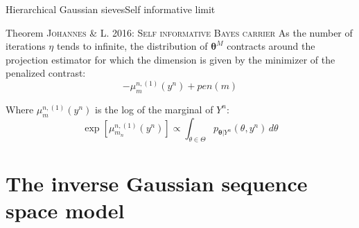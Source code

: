 \documentclass[10pt]{beamer}
\begin{document}



\begin{frame}{Hierarchical Gaussian sieves}{Self informative limit}
\begin{block}{Theorem \textsc{Johannes \& L. 2016: Self informative Bayes carrier}}
As the number of iterations $\eta$ tends to infinite, the distribution of $\boldsymbol{\theta}^{M}$ contracts around the projection estimator for which the dimension is given by the minimizer of the penalized contrast:
\[-\mu_{m}^{n, (1)}(y^{n}) + pen(m)\]
\end{block}
Where $\mu_{m}^{n, (1)}(y^{n})$ is the log of the marginal of $Y^{n}$:
\[\exp\left[\mu_{m_{n}}^{n, \left(1\right)}\left(y^{n}\right)\right] \propto \int_{\theta \in \Theta} p_{\boldsymbol{\theta}\vert Y^{n}}(\theta, y^{n}) \,d\theta\]
\end{frame}

\section{The inverse Gaussian sequence space model}
\end{document}

